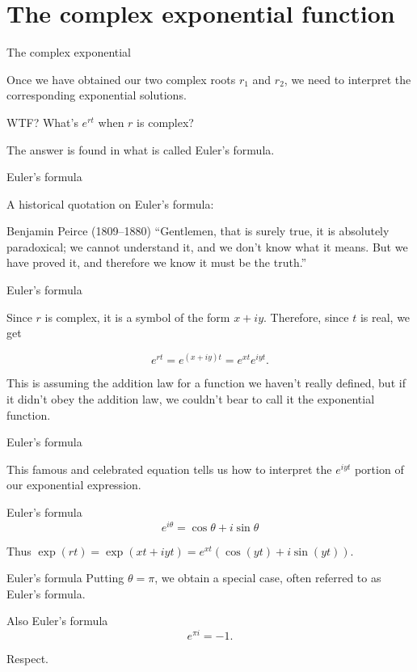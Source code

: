 \documentclass{beamer}
\begin{document}
\section{The complex exponential function}

\begin{frame}{The complex exponential}

  Once we have obtained our two complex roots $r_1$ and $r_2$, we need to interpret the corresponding exponential solutions. 
  \pause
  \begin{block}{WTF?}
    What's $e^{rt}$ when $r$ is complex?
  \end{block}
  
  The answer is found in what is called Euler's formula.
\end{frame}

\begin{frame}{Euler's formula}
  
  A historical quotation on Euler's formula:

  \begin{block}{Benjamin Peirce (1809--1880)}
    ``Gentlemen, that is surely true,
it is absolutely paradoxical;
we cannot understand it,
and we don't know what it means.
But we have proved it,
and therefore we know it must be the truth.''
  \end{block}

\end{frame}

\begin{frame}{Euler's formula}
  
  Since $r$ is complex, it is a symbol of the form $x + iy$. Therefore, since $t$ is real, we get

  \[
    e^{rt} = e^{(x+iy)t} = e^{xt} e^{iyt}.
  \]

  This is assuming the addition law for a function we haven't really defined, but if it didn't obey the addition law, we couldn't bear to call it the exponential function.
\end{frame}

\begin{frame}{Euler's formula}
  
  This famous and celebrated equation tells us how to interpret the $e^{iyt}$ portion of our exponential expression.

  \begin{block}{Euler's formula}
    \[e^{i \theta} = \cos{\theta} + i \sin{\theta}\]
  \end{block}
 
  Thus $\exp(rt) = \exp(xt + iyt) = e^{xt}(\cos{(yt)} + i \sin{(yt)})$.

\end{frame}

\begin{frame}{Euler's formula}
  Putting $\theta = \pi$, we obtain a special case, often referred to as Euler's formula.

  \begin{block}{Also Euler's formula}
    \[ e^{\pi i} = -1. \]
  \end{block}
  
  Respect.

\end{frame}
\end{document}
